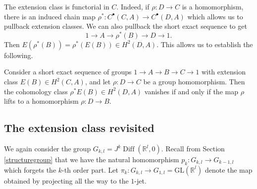 \documentclass[10pt]{amsart}
\newcommand{\Diff}{{\operatorname{Diff}}}
\newcommand{\rr}{\mathbb{R}}
\numberwithin{theoremalpha}{section}
\numberwithin{equation}{section}
\numberwithin{definition}{section}
\numberwithin{theorem}{section}
\numberwithin{proposition}{section}
\numberwithin{lemma}{section}
\numberwithin{example}{section}
\numberwithin{remark}{section}
\numberwithin{corollary}{section}
\numberwithin{question}{section}
\numberwithin{problem}{section}
\numberwithin{assumption}{section}
\theoremstyle{named}
\numberwithin{equation}{section}
\begin{document}
The extension class is functorial in $C$. Indeed, if $\rho : D \to C$ is a homomorphism, there is an induced chain map $\rho^* : C^{\bullet}(C, A) \to C^{\bullet}(D, A)$ which allows us to pullback extension classes. We can also pullback the short exact sequence to get 
\[
1 \to A \to \rho^*(B) \to D \to 1. 
\]
Then $E(\rho^*(B)) = \rho^*(E(B)) \in H^{2}(D, A)$. This allows us to establish the following. 

\begin{lemma}\label{lemm:functorialextension}
Consider a short exact sequence of groups $1 \rightarrow A \rightarrow B \rightarrow C \rightarrow 1$ with extension class $E(B) \in H^2(C, A)$, and let $\rho : D \to C$ be a group homomorphism. Then the cohomology class $\rho^{*}E(B) \in H^{2}(D, A)$ vanishes if and only if the map $\rho$ lifts to a homomorphism $\rho: D \to B$. 
\end{lemma}

\subsection{The extension class revisited}
We again consider the group $G_{k,l} = J^k\Diff(\rr^l,0)$. Recall from Section \ref{structuregroup} that we have the natural homomorphism $p_k : G_{k,l} \rightarrow G_{k-1,l}$ which forgets the $k$-th order part. Let $\pi_k : G_{k,l} \rightarrow G_{1,l} = \mathrm{GL}(\rr^l)$ denote the map obtained by projecting all the way to the $1$-jet. 
\end{document}
